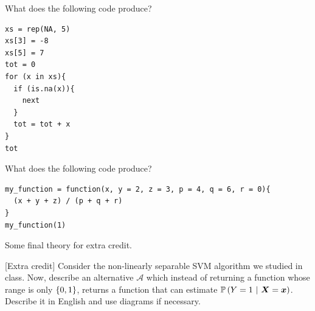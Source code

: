 \documentclass[12pt]{article}
\begin{document}
\vspace{0.2cm}
 What does the following code produce? 

\begin{lstlisting}
xs = rep(NA, 5)
xs[3] = -8
xs[5] = 7
tot = 0
for (x in xs){
  if (is.na(x)){
    next
  }
  tot = tot + x
}
tot
\end{lstlisting}


 What does the following code produce? 

\begin{lstlisting}
my_function = function(x, y = 2, z = 3, p = 4, q = 6, r = 0){
  (x + y + z) / (p + q + r)
}
my_function(1)
\end{lstlisting}

\eenum
\pagebreak


\problem Some final theory for extra credit. 

\benum

 [Extra credit] Consider the non-linearly separable SVM algorithm we studied in class. Now, describe an alternative $\mathcal{A}$ which instead of returning a function whose range is only $\left\{0,1\right\}$, returns a function that can estimate $\mathbb{P}\left(Y = 1~|~\boldsymbol{X} = \boldsymbol{x}\right)$.  Describe it in English and use diagrams if necessary.

\eenum
\end{document}
